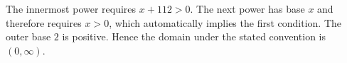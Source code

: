 The innermost power requires $x+112>0$. The next power has base $x$ and therefore requires $x>0$, which automatically implies the first condition. The outer base $2$ is positive. Hence the domain under the stated convention is $\boxed{(0,\infty)}$.
